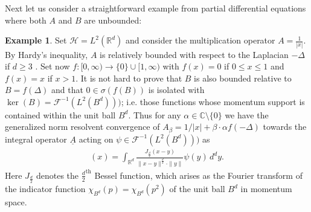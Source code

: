 \documentclass[reqno,12pt,letterpaper]{amsart}
\numberwithin{equation}{section}
\newcommand{\1}{\mathds{1}}
\theoremstyle{definition}
\newtheorem{Ex}[Th]{Example}
\begin{document}
	
	
Next let us consider a straightforward example from partial differential equations where both $A$ and $B$ are unbounded:
	
	
\begin{Ex}\label{rel_bdd_ex}
Set $\mathcal{H} = L^2(\mathds{R}^d)$ and consider the multiplication operator $A = \frac{1}{|x|}$. By Hardy's inequality, $A$ is relatively bounded with respect to the Laplacian $-\Delta$ if $d \geq 3$ \cite{simon_operator_2015}. Set now $f: [0,\infty) \rightarrow \{0\} \cup  [1, \infty)$ with $f(x) = 0 $ if $0\leq x \leq 1$ and $f(x) = x$ if $x > 1$.  It is not hard to prove that $B$ is also bounded relative to $B = f(\Delta)  $ and that $0 \in \sigma(f(B))$ is isolated with $\ker(B) = \mathcal{F}^{-1}(L^2(B^{d})))$; i.e. those functions whose momentum support is contained within the unit ball $B^{d}$. Thus for any $\alpha \in \mathds{C} \setminus \{0\}$ we have the generalized norm resolvent convergence of $A_\beta = 1/|x| + \beta\cdot \alpha  f(-\Delta)$ towards the integral operator $\underline{A}$ acting on $\psi \in \mathcal{F}^{-1}(L^2(B^{d})))$ as 
\begin{align}
[\underline{A}\psi](x) = \int_{\mathds{R}^d} \frac{J_{\frac{d}{2}}(x - y)}{\|x - y\|^{\frac{d}{2}}\cdot \|y\|} \psi(y)  \, d^dy.
\end{align} 
Here  $J_{\frac{d}{2}}$ denotes the $\frac{d}{2}^{\text{th}}$ Bessel function, which arises as the Fourier transform of the indicator function $\chi_{B^d}(p) = \chi_{B^d}(p^2)$ of the unit ball $B^d$ in momentum space.
	\end{Ex}
	
\end{document}
